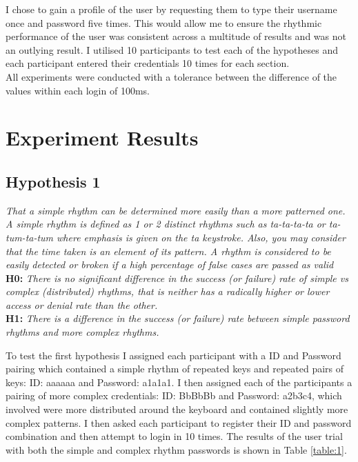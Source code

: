 \documentclass{article}
\begin{document}
I chose to gain a profile of the user by requesting them to type their username once and password five times. This would allow me to ensure the rhythmic performance of the user was consistent across a multitude of results and was not an outlying result. I utilised 10 participants to test each of the hypotheses and each participant entered their credentials 10 times for each section. \\ 

All experiments were conducted with a tolerance between the difference of the values within each login of 100ms. 

\section{Experiment Results}

\subsection{Hypothesis 1}
\begin{center}
\textit{ That a simple rhythm can be determined more easily than a more patterned one. A simple rhythm is defined as 1 or 2 distinct rhythms such as ta-ta-ta-ta or ta-tum-ta-tum where emphasis is given on the ta keystroke. Also, you may consider that the time taken is an element of its pattern. A rhythm is considered to be easily detected or broken if a high percentage of false cases are passed as valid} \\

\textbf{H0:} \textit{There	is	no significant	difference	in	the	success	(or	failure)	rate	of	simple	vs	complex	(distributed)	rhythms,	that	is	neither has	a	radically	higher	or	lower	access	or	denial	rate	than	the	other.} \newline \\

\textbf{H1:} \textit{There is a difference in the	success	(or	failure)	rate	between	simple password rhythms	and	more complex rhythms.}
\end{center}

To test the first hypothesis I assigned each participant with a ID and Password pairing which contained a simple rhythm of repeated keys and repeated pairs of keys: ID: aaaaaa and Password: a1a1a1. I then assigned each of the participants a pairing of more complex credentials: ID: BbBbBb and Password: a2b3c4, which involved were more distributed around the keyboard and contained slightly more complex patterns. I then asked each participant to register their ID and password combination and then attempt to login in 10 times. The results of the user trial with both the simple and complex rhythm passwords is shown in Table \ref{table:1}. 
\end{document}
